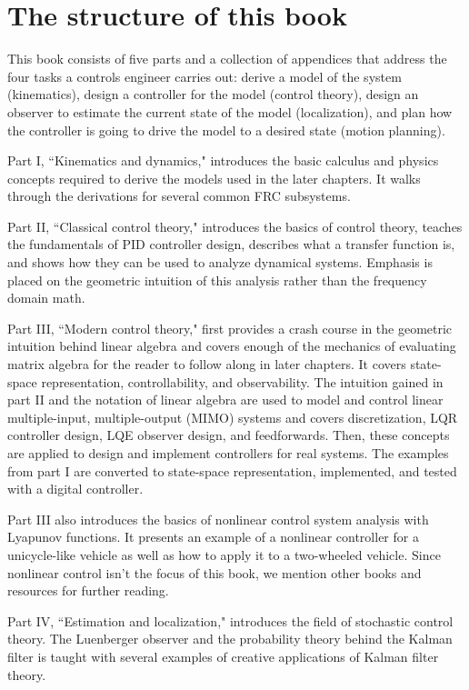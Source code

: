 \section{The structure of this book}

This book consists of five parts and a collection of appendices that address the
four tasks a controls engineer carries out: derive a model of the system
(kinematics), design a controller for the model (control theory), design an
observer to estimate the current state of the model (localization), and plan how
the controller is going to drive the model to a desired state (motion planning).

Part I, ``Kinematics and dynamics," introduces the basic calculus and physics
concepts required to derive the models used in the later chapters. It walks
through the derivations for several common FRC subsystems.

Part II, ``Classical control theory," introduces the basics of control theory,
teaches the fundamentals of PID controller design, describes what a transfer
function is, and shows how they can be used to analyze dynamical systems.
Emphasis is placed on the geometric intuition of this analysis rather than the
frequency domain math.

Part III, ``Modern control theory," first provides a crash course in the
geometric intuition behind linear algebra and covers enough of the mechanics of
evaluating matrix algebra for the reader to follow along in later chapters. It
covers state-space representation, controllability, and observability. The
intuition gained in part II and the notation of linear algebra are used to model
and control linear multiple-input, multiple-output (MIMO) systems and covers
discretization, LQR controller design, LQE observer design, and feedforwards.
Then, these concepts are applied to design and implement controllers for real
systems. The examples from part I are converted to state-space representation,
implemented, and tested with a digital controller.

Part III also introduces the basics of nonlinear control system analysis with
Lyapunov functions. It presents an example of a nonlinear controller for a
unicycle-like vehicle as well as how to apply it to a two-wheeled vehicle. Since
nonlinear control isn't the focus of this book, we mention other books and
resources for further reading.

Part IV, ``Estimation and localization," introduces the field of stochastic
control theory. The Luenberger observer and the probability theory behind the
Kalman filter is taught with several examples of creative applications of Kalman
filter theory.

